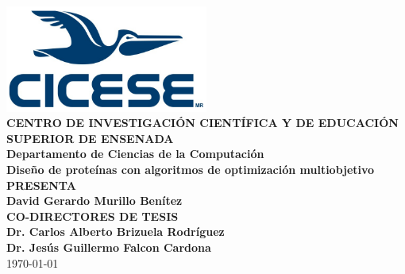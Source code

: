 \documentclass[12pt]{article}
\begin{document}
\begin{center}
    \includegraphics[width=0.5\textwidth]{./graphics/cicese_mr_con_margen_transpBG.png}\\[3em]
    \textbf{\Large CENTRO DE INVESTIGACIÓN CIENTÍFICA Y DE EDUCACIÓN SUPERIOR DE ENSENADA}\\[1em]
    \textbf{\large Departamento de Ciencias de la Computación}\\[3em]
    \textbf{\LARGE Diseño de proteínas con algoritmos de optimización multiobjetivo}\\[2em]

    \textbf{PRESENTA}\\[0.5em]
    \textbf{David Gerardo Murillo Benítez}\\[2em]

    \textbf{CO-DIRECTORES DE TESIS}\\[0.5em]
    \textbf{Dr. Carlos Alberto Brizuela Rodríguez}\\[0.5em]
    \textbf{Dr. Jesús Guillermo Falcon Cardona}\\[2em]
    
    
    \today
\end{center}
\end{document}
